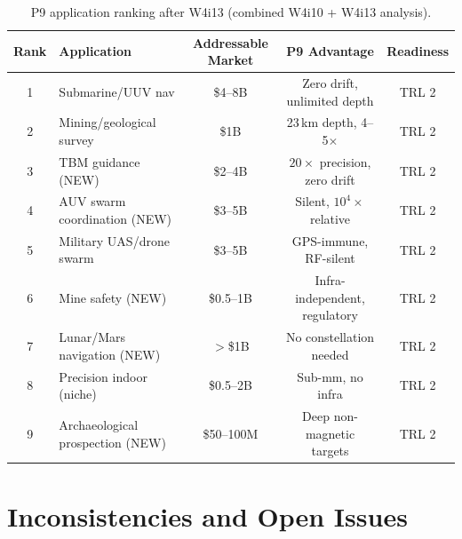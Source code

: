 \documentclass[11pt]{article}
\theoremstyle{definition}
\theoremstyle{remark}
\begin{document}
\begin{table}[H]
\centering
\caption{P9 application ranking after W4i13 (combined W4i10 + W4i13 analysis).}
\label{tab:app-ranking}
\begin{tabular}{@{}clccc@{}}
\toprule
Rank & Application & Addressable Market & P9 Advantage & Readiness \\
\midrule
1 & Submarine/UUV nav & \$4--8B & Zero drift, unlimited depth & TRL 2 \\
2 & Mining/geological survey & \$1B & 23\,km depth, 4--5$\times$ & TRL 2 \\
3 & TBM guidance (NEW) & \$2--4B & $20\times$ precision, zero drift & TRL 2 \\
4 & AUV swarm coordination (NEW) & \$3--5B & Silent, $10^4\times$ relative & TRL 2 \\
5 & Military UAS/drone swarm & \$3--5B & GPS-immune, RF-silent & TRL 2 \\
6 & Mine safety (NEW) & \$0.5--1B & Infra-independent, regulatory & TRL 2 \\
7 & Lunar/Mars navigation (NEW) & $>$\$1B & No constellation needed & TRL 2 \\
8 & Precision indoor (niche) & \$0.5--2B & Sub-mm, no infra & TRL 2 \\
9 & Archaeological prospection (NEW) & \$50--100M & Deep non-magnetic targets & TRL 2 \\
\bottomrule
\end{tabular}
\end{table}

\section{Inconsistencies and Open Issues}
\label{sec:inconsistencies}
\end{document}
